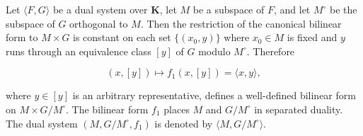 Let $\langle F, G \rangle$ be a dual system over $\mathbf{K}$, let $M$ be a subspace of $F$, and let $M^\circ$ be the subspace of $G$ orthogonal to $M$. Then the restriction of the canonical bilinear form to $M \times G$ is constant on each set $\{(x_0, y)\}$ where $x_0 \in M$ is fixed and $y$ runs through an equivalence class $[y]$ of $G$ modulo $M^\circ$. Therefore

$$(x, [y]) \mapsto f_1(x, [y]) = \langle x, y \rangle,$$

where $y \in [y]$ is an arbitrary representative, defines a well-defined bilinear form on $M \times G/M^\circ$. The bilinear form $f_1$ places $M$ and $G/M^\circ$ in separated duality. The dual system $(M, G/M^\circ, f_1)$ is denoted by $\langle M, G/M^\circ \rangle$.
